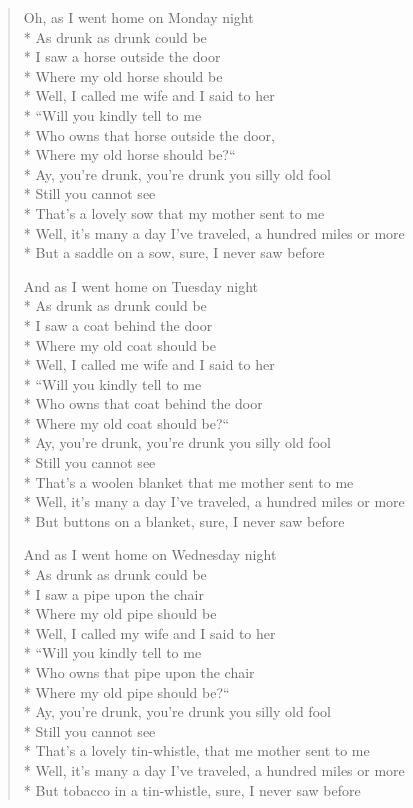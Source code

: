 \documentclass[9pt,twoside]{extarticle}
\newenvironment{xverse}{
	\begin{verse}
	\fontsize{8.5}{10.5}\selectfont
	}
	{
	\end{verse}
	\penalty 0
}
\begin{document}
\begin{xverse}
Oh, as I went home on Monday night \\*
As drunk as drunk could be \\*
I saw a horse outside the door \\*
Where my old horse should be \\*
Well, I called me wife and I said to her \\*
“Will you kindly tell to me \\*
Who owns that horse outside the door, \\*
Where my old horse should be?“ \\*
Ay, you’re drunk, you’re drunk you silly old fool \\*
Still you cannot see \\*
That’s a lovely sow that my mother sent to me \\*
Well, it’s many a day I’ve traveled, a hundred miles or more \\*
But a saddle on a sow, sure, I never saw before

And as I went home on Tuesday night \\*
As drunk as drunk could be \\*
I saw a coat behind the door \\*
Where my old coat should be \\*
Well, I called me wife and I said to her \\*
“Will you kindly tell to me \\*
Who owns that coat behind the door \\*
Where my old coat should be?“ \\*
Ay, you’re drunk, you’re drunk you silly old fool \\*
Still you cannot see \\*
That’s a woolen blanket that me mother sent to me \\*
Well, it’s many a day I’ve traveled, a hundred miles or more \\*
But buttons on a blanket, sure, I never saw before

And as I went home on Wednesday night \\*
As drunk as drunk could be \\*
I saw a pipe upon the chair \\*
Where my old pipe should be \\*
Well, I called my wife and I said to her \\*
“Will you kindly tell to me \\*
Who owns that pipe upon the chair \\*
Where my old pipe should be?“ \\*
Ay, you’re drunk, you’re drunk you silly old fool \\*
Still you cannot see \\*
That’s a lovely tin-whistle, that me mother sent to me \\*
Well, it’s many a day I’ve traveled, a hundred miles or more \\*
But tobacco in a tin-whistle, sure, I never saw before


\end{xverse}
\end{document}
